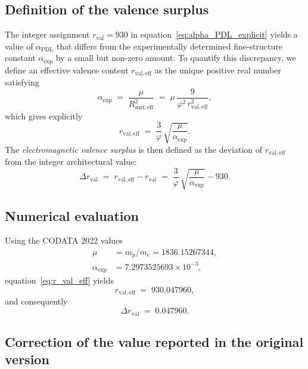 \documentclass[11pt,a4paper]{article}
\newcommand{\PDL}{\mathrm{PDL}}
\begin{document}
\subsection{Definition of the valence surplus}

The integer assignment $r_{\mathrm{val}} = 930$ in equation~\eqref{eq:alpha_PDL_explicit} yields a value of $\alpha_{\PDL}$ that differs from the experimentally determined fine-structure constant $\alpha_{\exp}$ by a small but non-zero amount. To quantify this discrepancy, we define an effective valence content $r_{\mathrm{val,eff}}$ as the unique positive real number satisfying
\begin{equation}
    \alpha_{\exp} 
    \;=\; \frac{\mu}{R_{\mathrm{surf,eff}}^2}
    \;=\; \mu\,\frac{9}{\varphi^2\,r_{\mathrm{val,eff}}^2},
    \label{eq:alpha_exp_exact}
\end{equation}
which gives explicitly
\begin{equation}
    r_{\mathrm{val,eff}} 
    \;=\; \frac{3}{\varphi}\,\sqrt{\frac{\mu}{\alpha_{\exp}}}.
    \label{eq:r_val_eff}
\end{equation}
The \emph{electromagnetic valence surplus} is then defined as the deviation of $r_{\mathrm{val,eff}}$ from the integer architectural value:
\begin{equation}
    \Delta r_{\mathrm{val}} 
    \;=\; r_{\mathrm{val,eff}} - r_{\mathrm{val}} 
    \;=\; \frac{3}{\varphi}\,\sqrt{\frac{\mu}{\alpha_{\exp}}} - 930.
    \label{eq:delta_r_def}
\end{equation}

\subsection{Numerical evaluation}

Using the CODATA 2022 values \cite{CODATA_2022}
\begin{align}
    \mu        &= m_p/m_e = 1836.15267344,\\
    \alpha_{\exp} &= 7.2973525693 \times 10^{-3},
\end{align}
equation~\eqref{eq:r_val_eff} yields
\begin{equation}
    r_{\mathrm{val,eff}} \;=\; 930.047960,
\end{equation}
and consequently
\begin{equation}
    \boxed{\Delta r_{\mathrm{val}} \;=\; 0.047960.}
    \label{eq:delta_r_value}
\end{equation}

\subsection{Correction of the value reported in the original version}
\end{document}
